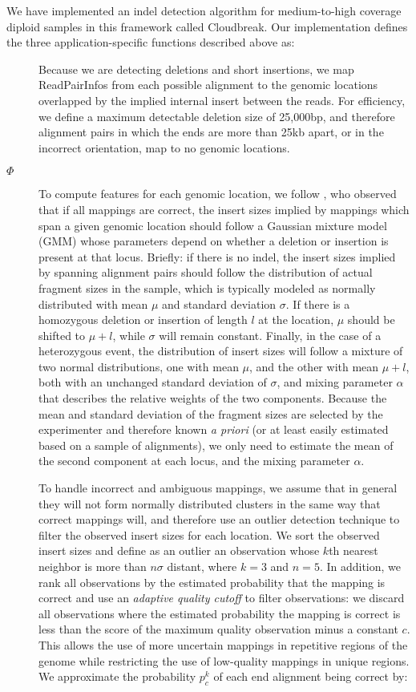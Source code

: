 \documentclass[11pt]{article}
\begin{document}
We have implemented an indel detection algorithm for medium-to-high coverage diploid samples in this framework called Cloudbreak. Our implementation defines the three application-specific functions described above as:
\begin{description}
\item[] Because we are detecting deletions and short insertions, we map ReadPairInfos from each possible alignment to the genomic locations overlapped by the implied internal insert between the reads. For efficiency, we define a maximum detectable deletion size of 25,000bp, and therefore alignment pairs in which the ends are more than 25kb apart, or in the incorrect orientation, map to no genomic locations.
\item[$\Phi$] To compute features for each genomic location, we follow \textcite{Lee:2009da}, who observed that if all mappings are correct, the insert sizes implied by mappings which span a given genomic location should follow a Gaussian mixture model (GMM) whose parameters depend on whether a deletion or insertion is present at that locus. Briefly: if there is no indel, the insert sizes implied by spanning alignment pairs should follow the distribution of actual fragment sizes in the sample, which is typically modeled as normally distributed with mean $\mu$ and standard deviation $\sigma$. If there is a homozygous deletion or insertion of length $l$ at the location, $\mu$ should be shifted to $\mu + l$, while $\sigma$ will remain constant. Finally, in the case of a heterozygous event, the distribution of insert sizes will follow a mixture of two normal distributions, one with mean $\mu$, and the other with mean $\mu + l$, both with an unchanged standard deviation of $\sigma$, and mixing parameter $\alpha$ that describes the relative weights of the two components. Because the mean and standard deviation of the fragment sizes are selected by the experimenter and therefore known \emph{a priori} (or at least easily estimated based on a sample of alignments), we only need to estimate the mean of the second component at each locus, and the mixing parameter $\alpha$.

To handle incorrect and ambiguous mappings, we assume that in general they will not form normally distributed clusters in the same way that correct mappings will, and therefore use an outlier detection technique to filter the observed insert sizes for each location. We sort the observed insert sizes and define as an outlier an observation whose $k$th nearest neighbor is more than $n\sigma$ distant, where $k = 3$ and $n = 5$. In addition, we rank all observations by the estimated probability that the mapping is correct and use an \emph{adaptive quality cutoff} to filter observations: we discard all observations where the estimated probability the mapping is correct is less than the score of the maximum quality observation minus a constant $c$. This allows the use of more uncertain mappings in repetitive regions of the genome while restricting the use of low-quality mappings in unique regions. We approximate the probability $p^{k}_c$ of each end alignment being correct by:


\end{description}
\end{document}
